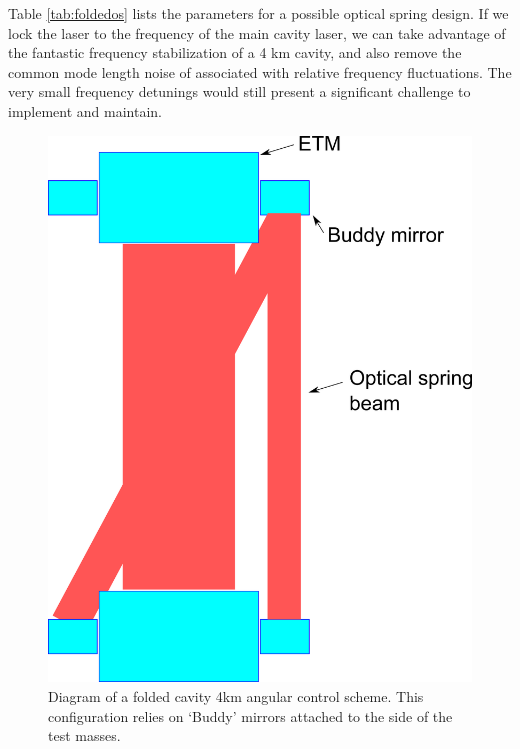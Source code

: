 Table \ref{tab:foldedos} lists the parameters for a possible optical spring design. If we lock the laser to the frequency of the main cavity laser, we can take advantage of the fantastic frequency stabilization of a 4 km cavity, and also remove the common mode length noise of associated with relative frequency fluctuations. The very small frequency detunings would still present a significant challenge to implement and maintain.

\begin{figure}[htp]%
\begin{center}
\includegraphics[width=.6\textwidth]{figures/application/longFoldedDiagram}%
\caption[4 km angular control]{Diagram of a folded cavity 4km angular control scheme. This configuration relies on `Buddy' mirrors attached to the side of the test masses.}%
\label{fig:longtrapfoldeddiagram}%
\end{center}
\end{figure}

